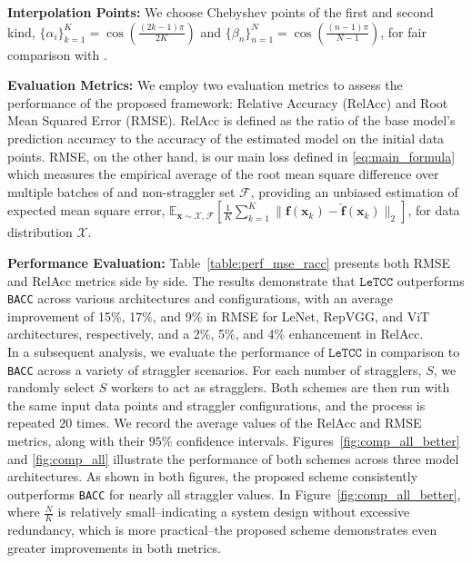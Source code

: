 \documentclass{article}
\def\nprcc{\texttt{LeTCC}}
\def\func{\mathbf{f}}
\def\stset{\mathcal{F}}
\def\fhat{\mathbf{\hat{f}}}
\begin{document}
\textbf{Interpolation Points:} We choose Chebyshev points of the first and second kind, $\{\alpha_i\}^K_{k=1} = \cos\left(\frac{(2k-1)\pi}{2K}\right)$ and $\{\beta_n\}^N_{n=1} = \cos\left(\frac{(n-1)\pi}{N-1}\right)$, for fair comparison with \citep{jahani2022berrut}.

\textbf{Evaluation Metrics:} We employ two evaluation metrics to assess the performance of the proposed framework: Relative Accuracy (RelAcc) and Root Mean Squared Error (RMSE). RelAcc is defined as the ratio of the base model's prediction accuracy to the accuracy of the estimated model on the initial data points. RMSE, on the other hand, is our main loss defined in \eqref{eq:main_formula} which measures the empirical average of the root mean square difference over multiple batches of and non-straggler set $\stset$, providing an unbiased estimation of expected mean square error, $\mathbb{E}_{\mathbf{x}\sim \mathcal{X}, \stset}\left[\frac{1}{K}\sum^K_{k=1} \| \func(\mathbf{x}_k) - \fhat(\mathbf{x}_k)\|_2\right]$, for data distribution $\mathcal{X}$.

{\bf Performance Evaluation:}
Table~\ref{table:perf_mse_racc} presents both RMSE and RelAcc metrics side by side.
The results demonstrate that $\nprcc$ outperforms \texttt{BACC} across various architectures and configurations, with an average improvement of 15\%, 17\%, and 9\% in RMSE for LeNet, RepVGG, and ViT architectures, respectively, and a 2\%, 5\%, and 4\% enhancement in RelAcc.\\
In a subsequent analysis, we evaluate the performance of $\nprcc$ in comparison to \texttt{BACC} across a variety of straggler scenarios. For each number of stragglers, $S$, we randomly select $S$ workers to act as stragglers. Both schemes are then run with the same input data points and straggler configurations, and the process is repeated $20$ times. We record the average values of the RelAcc and RMSE metrics, along with their $95\%$ confidence intervals. Figures~\ref{fig:comp_all_better} and \ref{fig:comp_all} illustrate the performance of both schemes across three model architectures. As shown in both figures, the proposed scheme consistently outperforms \texttt{BACC} for nearly all straggler values. In Figure~\ref{fig:comp_all_better}, where $\frac{N}{K}$ is relatively small--indicating a system design without excessive redundancy, which is more practical--the proposed scheme demonstrates even greater improvements in both metrics.
\end{document}

